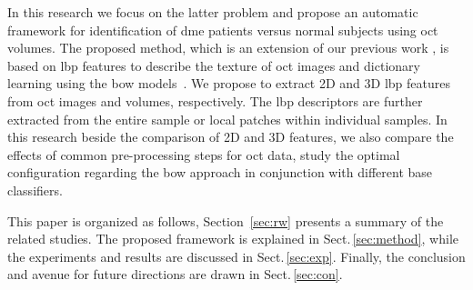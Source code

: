 In this research we focus on the latter problem and propose an automatic framework for identification of \ac{dme} patients versus normal subjects using \ac{oct} volumes.
The proposed method, which is an extension of our previous work \cite{Lemaintre2015miccaiOCT}, is based on \ac{lbp} features to describe the texture of \ac{oct} images and dictionary learning using the \ac{bow} models~\cite{Sivic2003}.
We propose to extract 2D and 3D \ac{lbp} features from \ac{oct} images and volumes, respectively.
The \ac{lbp} descriptors are further extracted from the entire sample or local patches within individual samples.
In this research beside the comparison of 2D and 3D features, we also compare the effects of common pre-processing steps for \ac{oct} data, study the optimal configuration regarding the \ac{bow} approach in conjunction with different base classifiers.


This paper is organized as follows, Section~\ref{sec:rw} presents a summary of the related studies.
The proposed framework is explained in Sect.\,\ref{sec:method}, while the experiments and results are discussed in Sect.\,\ref{sec:exp}.
Finally, the conclusion and avenue for future directions are drawn in Sect.\,\ref{sec:con}.




